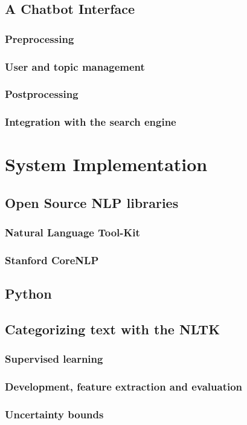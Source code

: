 \documentclass[12pt, twoside, a4paper, draft]{report}
\begin{document}
\section{A Chatbot Interface}
\subsection{Preprocessing}
\subsection{User and topic management}
\subsection{Postprocessing}
\subsection{Integration with the search engine}

\chapter{System Implementation}
\section{Open Source NLP libraries}
\subsection{Natural Language Tool-Kit}
\subsection{Stanford CoreNLP}
\section{Python}
\section{Categorizing text with the NLTK}
\subsection{Supervised learning}
\subsection{Development, feature extraction and evaluation}
\subsection{Uncertainty bounds}
\end{document}
